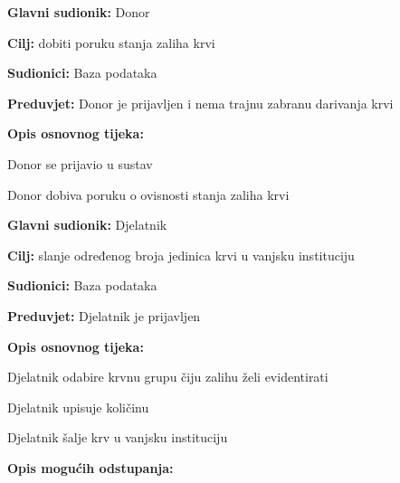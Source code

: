 \documentclass[11pt]{book}
\begin{document}
\begin{packed_item}
\begin{packed_item}
\begin{packed_item}
\begin{packed_enum}
						\end{packed_enum}

					\end{packed_item}

\noindent {}
					\begin{packed_item}
	
						\item \textbf{Glavni sudionik: }Donor
						\item \textbf{Cilj:} dobiti poruku stanja zaliha krvi
						\item \textbf{Sudionici:} Baza podataka
						\item \textbf{Preduvjet:} Donor je prijavljen i nema trajnu zabranu darivanja krvi
						\item \textbf{Opis osnovnog tijeka:}
						
						\item[] \begin{packed_enum}
	
							\item Donor se prijavio u sustav
							\item Donor dobiva poruku o ovisnosti stanja zaliha krvi
							
						\end{packed_enum}

					\end{packed_item}


\noindent {}
					\begin{packed_item}
	
						\item \textbf{Glavni sudionik: }Djelatnik
						\item \textbf{Cilj:} slanje određenog broja jedinica krvi u vanjsku instituciju
						\item \textbf{Sudionici:} Baza podataka
						\item \textbf{Preduvjet:} Djelatnik je prijavljen
						\item \textbf{Opis osnovnog tijeka:}
						
						\item[] \begin{packed_enum}
	
							\item Djelatnik odabire krvnu grupu čiju zalihu želi evidentirati
							\item Djelatnik upisuje količinu
							\item Djelatnik šalje krv u vanjsku instituciju
						\end{packed_enum}
						\item  \textbf{Opis mogućih odstupanja:}
						

\end{packed_item}
\end{packed_item}
\end{packed_item}
\end{document}
